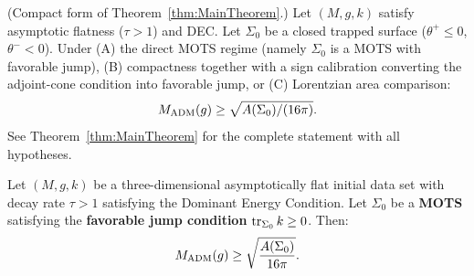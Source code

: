 \begin{theorem}\label{thm:SPI_Core}
\textup{(}Compact form of Theorem~\textup{\ref{thm:MainTheorem}.)}
Let $(M, g, k)$ satisfy asymptotic flatness ($\tau > 1$) and DEC. Let $\Sigma_0$ be a closed trapped surface ($\theta^+ \le 0$, $\theta^- < 0$). Under (A) the direct MOTS regime (namely $\Sigma_0$ is a MOTS with favorable jump), (B) compactness together with a sign calibration converting the adjoint-cone condition into favorable jump, or (C) Lorentzian area comparison:
\begin{equation}\label{eq:PenroseCore}
    M_{\mathrm{ADM}}(g) \ge \sqrt{A(\Sigma_0)/(16\pi)}.
\end{equation}
See Theorem~\ref{thm:MainTheorem} for the complete statement with all hypotheses.
\end{theorem}

\makeatletter
\newcommand{\labelaliasaliases}{}%
\makeatother

\begin{theorem}\label{thm:SPI}\label{thm:penroseinitial}
Let $(M, g, k)$ be a three-dimensional asymptotically flat initial data set with decay rate $\tau > 1$ satisfying the Dominant Energy Condition. Let $\Sigma_0$ be a \textbf{MOTS} satisfying the \textbf{favorable jump condition} $\operatorname{tr}_{\Sigma_0} k \ge 0$. Then:
\begin{equation}\label{eq:PenroseGeneral}
    M_{\mathrm{ADM}}(g) \ge \sqrt{\frac{A(\Sigma_0)}{16\pi}}.
\end{equation}
\end{theorem}

